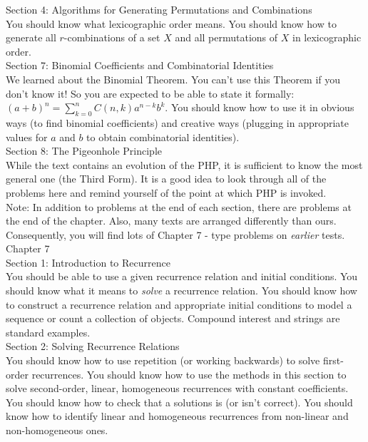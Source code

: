 \documentclass[12pt]{article}
\begin{document}
Section 4: Algorithms for Generating Permutations and Combinations\\
You should know what lexicographic order means. You should know how to generate all $r$-combinations of a set $X$ and all permutations of $X$ in lexicographic order.\\

Section 7: Binomial Coefficients and Combinatorial Identities\\
We learned about the Binomial Theorem. You can't use this Theorem if you don't know it! So you are expected to be able to state it formally: $(a+b)^n = \sum_{k=0}^n C(n,k)a^{n-k}b^k.$ You should know how to use it in obvious ways (to find binomial coefficients) and creative ways (plugging in appropriate values for $a$ and $b$ to obtain combinatorial identities).\\

Section 8: The Pigeonhole Principle\\
While the text contains an evolution of the PHP, it is sufficient to know the most general one (the Third Form). It is a good idea to look through all of the problems here and remind yourself of the point at which PHP is invoked. \\

Note: In addition to problems at the end of each section, there are problems at the end of the chapter. Also, many texts are arranged differently than ours. Consequently, you will find lots of Chapter 7 - type problems  on \emph{earlier} tests.\\

Chapter 7\\

Section 1: Introduction to Recurrence\\
You should be able to use a given recurrence relation and initial conditions. You should know what it means to \emph{solve} a recurrence relation. You should know how to construct a recurrence relation and appropriate initial conditions to model a sequence or count a collection of objects. Compound interest and strings are standard examples.\\

Section 2: Solving Recurrence Relations\\
You should know how to use repetition (or working backwards) to solve first-order recurrences. You should know how to use the methods in this section to solve second-order, linear, homogeneous recurrences with constant coefficients. You should know how to check that a solutions is (or isn't correct). You should know how to identify linear and homogeneous recurrences from non-linear and non-homogeneous ones.
\end{document}
